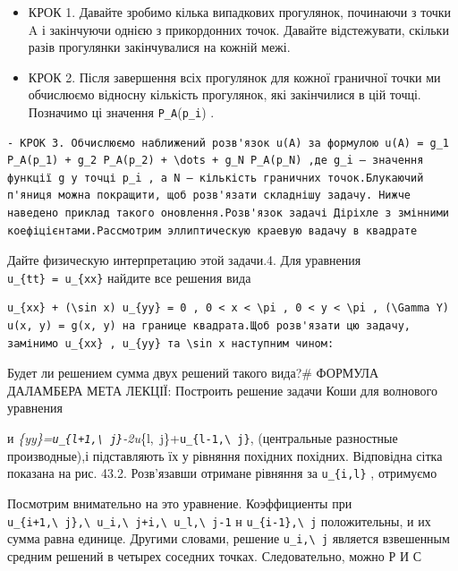 \documentclass[
  ukrainian,
]{article}
\begin{document}
\begin{itemize}
\item
  КРОК 1. Давайте зробимо кілька випадкових прогулянок, починаючи з
  точки A і закінчуючи однією з прикордонних точок. Давайте
  відстежувати, скільки разів прогулянки закінчувалися на кожній межі.
\item
  КРОК 2. Після завершення всіх прогулянок для кожної граничної точки ми
  обчислюємо відносну кількість прогулянок, які закінчилися в цій точці.
  Позначимо ці значення \texttt{P\_A}(\texttt{p\_i}) .
\end{itemize}

\begin{verbatim}
- КРОК 3. Обчислюємо наближений розв'язок u(A) за формулою u(A) = g_1 P_A(p_1) + g_2 P_A(p_2) + \dots + g_N P_A(p_N) ,де g_i — значення функції g у точці p_i , а N — кількість граничних точок.Блукаючий п'яниця можна покращити, щоб розв'язати складнішу задачу. Нижче наведено приклад такого оновлення.Розв'язок задачі Діріхле з змінними коефіцієнтами.Рассмотрим эллиптическую краевую вадачу в квадрате
\end{verbatim}

Дайте физическую интерпретацию этой задачи.4. Для уравнения
\texttt{u\_\{tt\}\ =\ u\_\{xx\}} найдите все решения вида

\begin{verbatim}
u_{xx} + (\sin x) u_{yy} = 0 , 0 < x < \pi , 0 < y < \pi , (\Gamma Y) u(x, y) = g(x, y) на границе квадрата.Щоб розв'язати цю задачу, замінимо u_{xx} , u_{yy} та \sin x наступним чином:
\end{verbatim}

Будет ли решением сумма двух решений такого вида?\# ФОРМУЛА ДАЛАМБЕРА
МЕТА ЛЕКЦІЇ: Построить решение задачи Коши для волнового уравнения

и
\emph{\{yy\}=\texttt{u\_\{l+1,\textbackslash{}\ j\}}-2u}\{l,~j\}+\texttt{u\_\{l-1,\textbackslash{}\ j\}},
(центральные разностные производные),і підставляють їх у рівняння
похідних похідних. Відповідна сітка показана на рис. 43.2. Розв'язавши
отримане рівняння за \texttt{u\_\{i,l\}} , отримуємо

Посмотрим внимательно на это уравнение. Коэффициенты при
\texttt{u\_\{i+1,\textbackslash{}\ j\},\textbackslash{}\ u\_i,\textbackslash{}\ j+i,\textbackslash{}\ u\_l,\textbackslash{}\ j-1}
н \texttt{u\_\{i-1\},\textbackslash{}\ j} положительны, и их сумма равна
единице. Другими словами, решение \texttt{u\_i,\textbackslash{}\ j}
является взвешенным средним решений в четырех соседних точках.
Следовательно, можно Р И С
\end{document}
